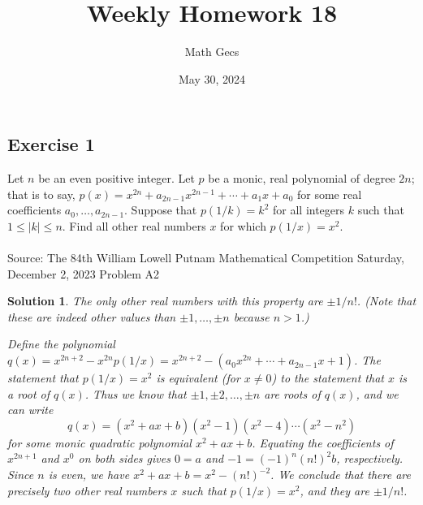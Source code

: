 \documentclass[12pt]{article}
\title{Weekly Homework 18}
\author{Math Gecs}
\date{May 30, 2024}
\newtheorem*{solution*}{Solution}
\begin{document}
\maketitle

\subsection*{Exercise 1}
Let $n$ be an even positive integer. Let $p$ be a monic, real polynomial of degree $2n$; that is to say, $p(x) = x^{2n} + a_{2n-1} x^{2n-1} + \cdots + a_1 x + a_0$ for some real coefficients $a_0, \dots, a_{2n-1}$. Suppose that $p(1/k) = k^2$ for all integers $k$ such that $1 \leq |k| \leq n$. Find all other real numbers $x$ for which $p(1/x) = x^2$.\\ \\
Source: The 84th William Lowell Putnam Mathematical Competition 
Saturday, December 2, 2023 Problem A2\\

\begin{solution*}
The only other real numbers with this property are $\pm 1/n!$.
(Note that these are indeed \emph{other} values than $\pm 1, \dots, \pm n$ because $n>1$.)

Define the polynomial $q(x) = x^{2n+2}-x^{2n}p(1/x) = x^{2n+2}-(a_0x^{2n}+\cdots+a_{2n-1}x+1)$. The statement that $p(1/x)=x^2$ is equivalent (for $x\neq 0$) to the statement that $x$ is a root of $q(x)$. Thus we know that $\pm 1,\pm 2,\ldots,\pm n$ are roots of $q(x)$, and we can write
\[
q(x) = (x^2+ax+b)(x^2-1)(x^2-4)\cdots (x^2-n^2)
\]
for some monic quadratic polynomial $x^2+ax+b$. Equating the coefficients of $x^{2n+1}$ and $x^0$ on both sides gives $0=a$ and $-1=(-1)^n(n!)^2 b$, respectively. Since $n$ is even, we have $x^2+ax+b = x^2-(n!)^{-2}$. We conclude that there are precisely two other real numbers $x$ such that $p(1/x)=x^2$, and they are $\pm 1/n!$.

\end{solution*}
\end{document}
